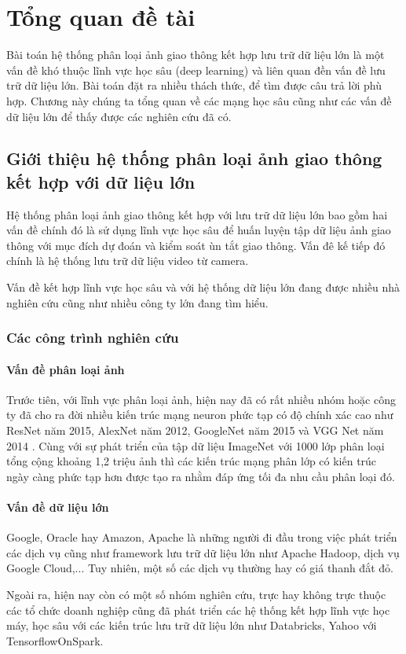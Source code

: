 \chapter{Tổng quan đề tài}
Bài toán hệ thống phân loại ảnh giao thông kết hợp lưu trữ dữ liệu lớn là một vấn đề khó thuộc lĩnh vực học sâu (deep learning) và liên quan đền vấn đề lưu trữ dữ liệu lớn. Bài toán đặt ra nhiều thách thức, để tìm được câu trả lời phù hợp. Chương này chúng ta tổng quan về các mạng học sâu cũng như các vấn đề dữ liệu lớn để thấy được các nghiên cứu đã có.
\section{Giới thiệu hệ thống phân loại ảnh giao thông kết hợp với dữ liệu lớn}
Hệ thống phân loại ảnh giao thông kết hợp với lưu trữ dữ liệu lớn bao gồm hai vấn đề chính đó là sử dụng lĩnh vực học sâu để huấn luyện tập dữ liệu ảnh giao thông với mục đích dự đoán và kiểm soát ùn tắt giao thông. Vấn đê kế tiếp đó chính là hệ thống lưu trữ dữ liệu video từ camera.\par 
Vấn đề kết hợp lĩnh vực học sâu và với hệ thống dữ liệu lớn đang được nhiều nhà nghiên cứu cũng như nhiều công ty lớn đang tìm hiểu.
\subsection{Các công trình nghiên cứu}
\subsubsection*{Vấn đề phân loại ảnh}
Trước tiên, với lĩnh vực phân loại ảnh, hiện nay đã có rất nhiều nhóm hoặc công ty đã cho ra đời nhiều kiến trúc mạng neuron phức tạp có độ chính xác cao như ResNet\cite{resnet} năm 2015, AlexNet\cite{alex} năm 2012, GoogleNet\cite{1} năm 2015 và VGG Net năm 2014 \cite{vgg} . Cùng với sự phát triển của tập dữ liệu ImageNet với 1000 lớp phân loại tổng cộng khoảng 1,2 triệu ảnh thì các kiến trúc mạng phân lớp có kiến trúc ngày càng phức tạp hơn được tạo ra nhằm đáp ứng tối đa nhu cầu phân loại đó.\par

\subsubsection*{Vấn đề dữ liệu lớn}
Google, Oracle hay Amazon, Apache là những người đi đầu trong việc phát triển các dịch vụ cũng như framework lưu trữ dữ liệu lớn như Apache Hadoop, dịch vụ Google Cloud,... Tuy nhiên, một số các dịch vụ thường hay có giá thanh đắt đỏ.\par 
Ngoài ra, hiện nay còn có một số nhóm nghiên cứu, trực hay không trực thuộc các tổ chức doanh nghiệp cũng đã phát triển các hệ thống kết hợp lĩnh vực học máy, học sâu với các kiến trúc lưu trữ dữ liệu lớn như Databricks, Yahoo với TensorflowOnSpark.\par 

